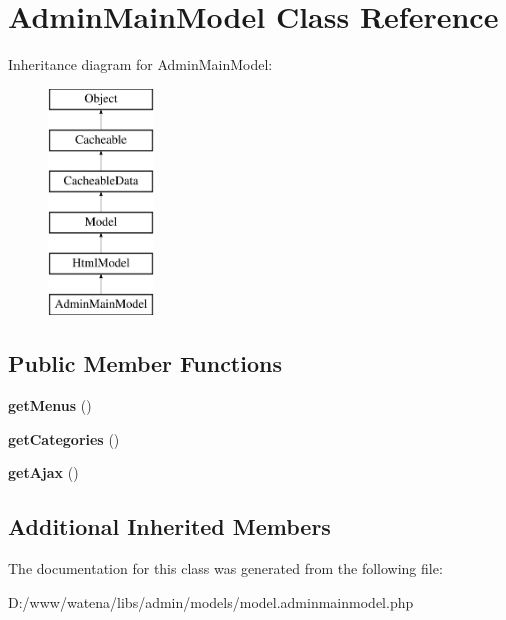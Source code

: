 \hypertarget{class_admin_main_model}{\section{Admin\-Main\-Model Class Reference}
\label{class_admin_main_model}
}
Inheritance diagram for Admin\-Main\-Model\-:\begin{figure}[H]
\begin{center}
\leavevmode
\includegraphics[height=6.000000cm]{class_admin_main_model}
\end{center}
\end{figure}
\subsection*{Public Member Functions}
\begin{DoxyCompactItemize}
\item 
\hypertarget{class_admin_main_model_adbdbbbc2378ce70d70f32ee9fe2d1a19}{{\bfseries get\-Menus} ()}\label{class_admin_main_model_adbdbbbc2378ce70d70f32ee9fe2d1a19}

\item 
\hypertarget{class_admin_main_model_a2d2b04a4c551aae243867e1d0bd92776}{{\bfseries get\-Categories} ()}\label{class_admin_main_model_a2d2b04a4c551aae243867e1d0bd92776}

\item 
\hypertarget{class_admin_main_model_af728bbcb85252b58ff0b4ff19d260be2}{{\bfseries get\-Ajax} ()}\label{class_admin_main_model_af728bbcb85252b58ff0b4ff19d260be2}

\end{DoxyCompactItemize}
\subsection*{Additional Inherited Members}


The documentation for this class was generated from the following file\-:\begin{DoxyCompactItemize}
\item 
D\-:/www/watena/libs/admin/models/model.\-adminmainmodel.\-php\end{DoxyCompactItemize}
